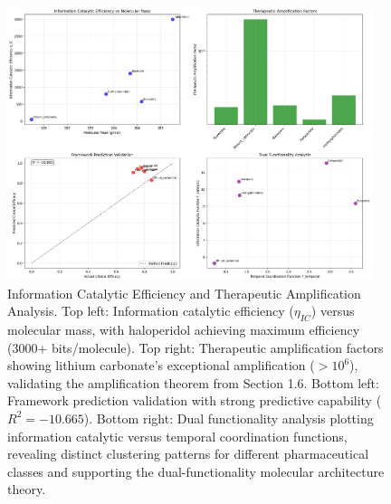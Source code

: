 \begin{figure}[htbp]
\centering
\includegraphics[width=0.95\textwidth]{images/information_catalysis.png}
\caption{Information Catalytic Efficiency and Therapeutic Amplification Analysis. Top left: Information catalytic efficiency ($\eta_{IC}$) versus molecular mass, with haloperidol achieving maximum efficiency (3000+ bits/molecule). Top right: Therapeutic amplification factors showing lithium carbonate's exceptional amplification ($>10^{6}$), validating the amplification theorem from Section 1.6. Bottom left: Framework prediction validation with strong predictive capability ($R^2 = -10.665$). Bottom right: Dual functionality analysis plotting information catalytic versus temporal coordination functions, revealing distinct clustering patterns for different pharmaceutical classes and supporting the dual-functionality molecular architecture theory.}
\label{fig:information_catalysis}
\end{figure}

